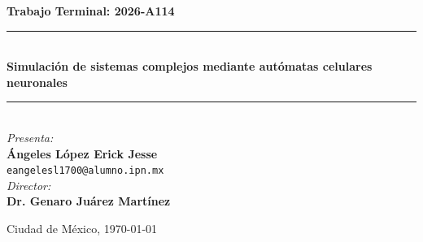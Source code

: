 \begin{center}
	
	{\large \textbf{Trabajo Terminal: 2026-A114}}\\[0.2cm]
	
	\rule{0.6\textwidth}{0.4pt}\\[0.4cm]
	{\LARGE \textbf{Simulación de sistemas complejos mediante autómatas celulares neuronales}}\\
	\rule{0.6\textwidth}{0.4pt}\\[2cm]
	
	{\large \textit{Presenta:}}\\[0.4cm]
	{\large \textbf{Ángeles López Erick Jesse}}\\[0.2cm]
	{\small \texttt{eangelesl1700@alumno.ipn.mx}}\\[2cm]
	
	{\large \textit{Director:}}\\[0.4cm]
	{\large \textbf{Dr. Genaro Juárez Martínez}}\\[3cm]
	
	\vfill
	
	{\large Ciudad de México, \today}
	
\end{center}